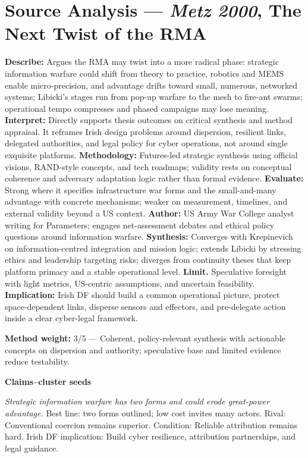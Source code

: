 \section*{Source Analysis — \textit{Metz 2000}, The Next Twist of the RMA}
\textbf{Describe:} Argues the RMA may twist into a more radical phase: strategic information warfare could shift from theory to practice, robotics and MEMS enable micro-precision, and advantage drifts toward small, numerous, networked systems; Libicki’s stages run from pop-up warfare to the mesh to fire-ant swarms; operational tempo compresses and phased campaigns may lose meaning.
\textbf{Interpret:} Directly supports thesis outcomes on critical synthesis and method appraisal. It reframes Irish design problems around dispersion, resilient links, delegated authorities, and legal policy for cyber operations, not around single exquisite platforms.
\textbf{Methodology:} Futures-led strategic synthesis using official visions, RAND-style concepts, and tech roadmaps; validity rests on conceptual coherence and adversary adaptation logic rather than formal evidence.
\textbf{Evaluate:} Strong where it specifies infrastructure war forms and the small-and-many advantage with concrete mechanisms; weaker on measurement, timelines, and external validity beyond a US context.
\textbf{Author:} US Army War College analyst writing for Parameters; engages net-assessment debates and ethical policy questions around information warfare.
\textbf{Synthesis:} Converges with Krepinevich on information-centred integration and mission logic; extends Libicki by stressing ethics and leadership targeting risks; diverges from continuity theses that keep platform primacy and a stable operational level.
\textbf{Limit.} Speculative foresight with light metrics, US-centric assumptions, and uncertain feasibility.
\textbf{Implication:} Irish DF should build a common operational picture, protect space-dependent links, disperse sensors and effectors, and pre-delegate action inside a clear cyber-legal framework.

\textbf{Method weight:} 3/5 — Coherent, policy-relevant synthesis with actionable concepts on dispersion and authority; speculative base and limited evidence reduce testability.

\textbf{Claims–cluster seeds}

\textit{Strategic information warfare has two forms and could erode great-power advantage.} Best line: two forms outlined; low cost invites many actors. Rival: Conventional coercion remains superior. Condition: Reliable attribution remains hard. Irish DF implication: Build cyber resilience, attribution partnerships, and legal guidance.

